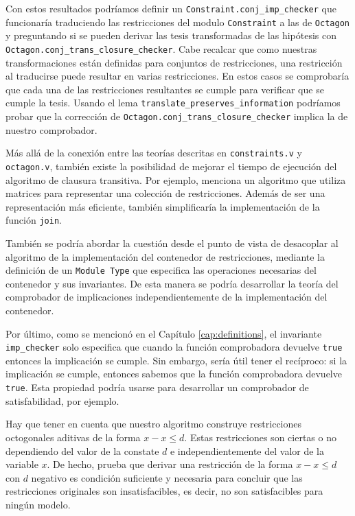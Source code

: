 Con estos resultados podríamos definir un \texttt{Constraint.conj_imp_checker}
que funcionaría traduciendo las restricciones del modulo \texttt{Constraint} a las
de \texttt{Octagon} y preguntando si se pueden derivar las tesis transformadas de las
hipótesis con \texttt{Octagon.conj_trans_closure_checker}. Cabe recalcar que como 
nuestras transformaciones están definidas para conjuntos de restricciones, una restricción al 
traducirse puede resultar en varias restricciones. En estos casos se comprobaría que cada una
de las restricciones resultantes se cumple para verificar que se cumple la tesis. Usando el lema
\texttt{translate_preserves_information} 
podríamos probar que la corrección de \texttt{Octagon.conj_trans_closure_checker} 
implica la de nuestro comprobador.

Más allá de la conexión entre las teorías descritas en \texttt{constraints.v} y
\texttt{octagon.v}, también existe la posibilidad de mejorar el tiempo de ejecución
del algoritmo de clausura transitiva. Por ejemplo, \cite{TransitiveClosure} menciona un algoritmo
que utiliza matrices para representar una colección de restricciones. Además de ser una 
representación más eficiente, también simplificaría la implementación de la función
\texttt{join}.

También se podría abordar la cuestión desde el punto de vista de desacoplar al algoritmo de la 
implementación del contenedor de restricciones, mediante la definición de un 
\texttt{Module Type} que especifica las operaciones necesarias del contenedor y sus 
invariantes. De esta manera se podría desarrollar la teoría del comprobador de implicaciones
independientemente de la implementación del contenedor.

Por último, como se mencionó en el Capítulo \ref{cap:definitions}, el invariante \texttt{imp_checker} 
solo especifica que cuando la función comprobadora devuelve \texttt{true} entonces la implicación
se cumple. Sin embargo, sería útil tener el recíproco: si la implicación se cumple, entonces sabemos que
la función comprobadora devuelve \texttt{true}. Esta propiedad podría usarse para desarrollar un 
comprobador de satisfabilidad, por ejemplo.

Hay que tener en cuenta que nuestro algoritmo construye restricciones octogonales aditivas
de la forma $x - x \le d$. Estas restricciones son ciertas o no dependiendo del valor de
la constate $d$ e independientemente del valor de la variable $x$. De hecho, \cite{HarveyStuckey}
prueba que derivar una restricción de la forma $x - x \le d$ con $d$ negativo es condición
suficiente y necesaria para concluir que las restricciones originales son insatisfacibles,
es decir, no son satisfacibles para ningún modelo.

